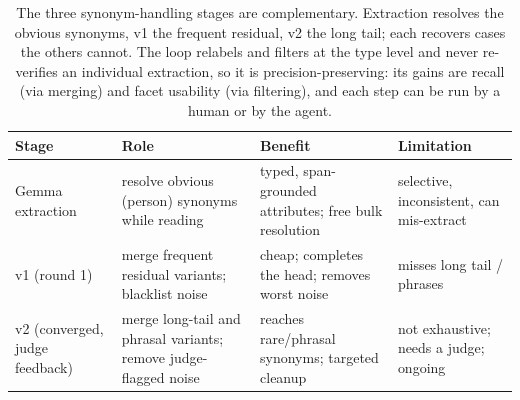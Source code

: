 \begin{table}[t]
\centering
\small
\setlength{\tabcolsep}{4pt}
\begin{tabular}{@{}p{1.4cm}p{2.2cm}p{1.7cm}p{1.7cm}@{}}
\toprule
\textbf{Stage} & \textbf{Role} & \textbf{Benefit} & \textbf{Limitation} \\
\midrule
Gemma extraction & resolve obvious (person) synonyms while reading & typed, span-grounded attributes; free bulk resolution & selective, inconsistent, can mis-extract \\
\addlinespace
v1 (round 1) & merge frequent residual variants; blacklist noise & cheap; completes the head; removes worst noise & misses long tail / phrases \\
\addlinespace
v2 (converged, judge feedback) & merge long-tail and phrasal variants; remove judge-flagged noise & reaches rare/phrasal synonyms; targeted cleanup & not exhaustive; needs a judge; ongoing \\
\bottomrule
\end{tabular}
\caption{The three synonym-handling stages are complementary. Extraction resolves the
obvious synonyms, v1 the frequent residual, v2 the long tail; each recovers cases the
others cannot. The loop relabels and filters at the type level and never re-verifies an
individual extraction, so it is precision-preserving: its gains are recall (via merging)
and facet usability (via filtering), and each step can be run by a human or by the agent.}
\label{tab:design-rationale}
\end{table}
